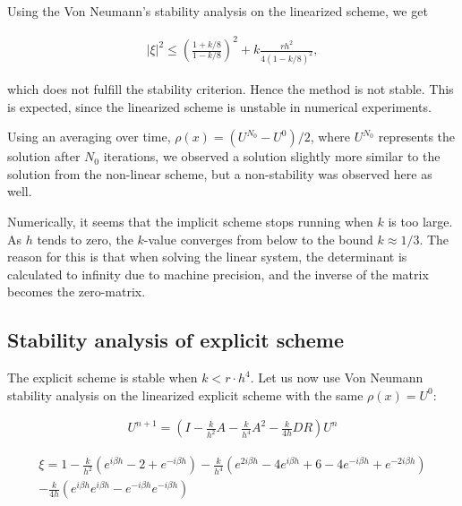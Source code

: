 


Using the Von Neumann's stability analysis on the linearized scheme, we get 

\begin{align*}
|\xi |^2 \le \left(\frac{1+k/8}{1-k/8}\right)^2 + k\frac{rh^2}{4(1-k/8)^2},
\end{align*}

which does not fulfill the stability criterion. Hence the method is not stable. This is expected, since the linearized scheme is unstable in numerical experiments. 

Using an averaging over time, $\rho(x) = (U^{N_0}-U^0)/2$, where $U^{N_0}$ represents the solution after $N_0$ iterations, we observed a solution slightly more similar to the solution from the non-linear scheme, but a non-stability was observed here as well.
 
Numerically, it seems that the implicit scheme stops running when $k$ is too large. As $h$ tends to zero, the $k$-value converges from below to the bound $k \approx 1/3$. The reason for this is that when solving the linear system, the determinant is calculated to infinity due to machine precision, and the inverse of the matrix becomes the zero-matrix. 


\subsection{Stability analysis of explicit scheme}

The explicit scheme is stable when $k < r \cdot h^4$. Let us now use Von Neumann stability analysis on the linearized explicit scheme with the same $\rho(x) = U^0$:


\begin{align*}
U^{n+1} = \left(I - \frac{k}{h^2}A - \frac{k}{h^4}A^2 - \frac{k}{4h} DR\right)U^{n} 
\end{align*}


\begin{align*}
\xi = 1 - \frac{k}{h^2}(e^{i\beta h}-2+e^{-i\beta h}) - \frac{k}{h^4}(e^{2i\beta h}-4e^{i\beta h}+6-4e^{-i\beta h}+e^{-2i\beta h}) \\
 - \frac{k}{4h}(e^{i\beta h}e^{i\beta h} - e^{-i\beta h}e^{-i\beta h})\\
\end{align*}

